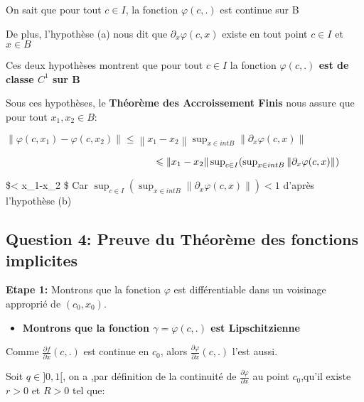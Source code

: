\documentclass[11pt]{article}
\providecommand{\tightlist}{%
      \setlength{\itemsep}{0pt}\setlength{\parskip}{0pt}}
\begin{document}
    On sait que pour tout \(c\in I\), la fonction \(\varphi(c,.)\) est
continue sur B

De plus, l'hypothèse (a) nous dit que \(\partial _x \varphi (c,x)\)
existe en tout point \(c\in I\) et \(x\in B\)

Ces deux hypothèses montrent que pour tout \(c\in I\) la fonction
\textbf{\(\varphi(c,.)\) est de classe \(C^1\) sur B}

Sous ces hypothèses, le \textbf{Théorème des Accroissement Finis} nous
assure que pour tout \(x_1, x_2\in B\):

\(\left\lVert \varphi (c,x_1)-\varphi(c,x_2) \right\lVert \leqslant \left\lVert x_1-x_2 \right\lVert \sup_{x\in intB}\left\lVert \partial _x \varphi(c,x) \right\lVert\)

\(\hspace{150px}\leqslant \left\lVert x_1-x_2 \right\lVert \sup_{c\in I}(\sup_{x\in intB}\left\lVert \partial _x \varphi(c,x) \right\lVert)\)

\$\hspace{150px}\textless{} \left\lVert x\_1-x\_2
\right\lVert  \hspace{50px} \$ Car
\(\sup_{c\in I}(\sup_{x\in intB}\left\lVert \partial _x \varphi(c,x) \right\lVert)<1\)
d'après l'hypothèse (b)

    \hypertarget{question-4-preuve-du-thuxe9oruxe8me-des-fonctions-implicites}{%
\subsection{\texorpdfstring{\textbf{Question 4: Preuve du Théorème des
fonctions
implicites}}{Question 4: Preuve du Théorème des fonctions implicites}}\label{question-4-preuve-du-thuxe9oruxe8me-des-fonctions-implicites}}

    \textbf{Etape 1:} Montrons que la fonction \(\varphi\) est
différentiable dans un voisinage approprié de \((c_0,x_0)\).

\begin{itemize}
\tightlist
\item
  \textbf{Montrons que la fonction \(\gamma = \varphi (c,.)\) est
  Lipschitzienne}
\end{itemize}

Comme \(\frac{\partial f}{\partial x}(c,.)\) est continue en \(c_0\),
alors \(\frac{\partial \varphi}{\partial x}(c,.)\) l'est aussi.

Soit \(q \in ]0,1[\), on a ,par définition de la continuité de
\(\frac{\partial \varphi}{\partial x}\) au point \(c_0\),qu'il existe
\(r>0\) et \(R>0\) tel que:
\end{document}
